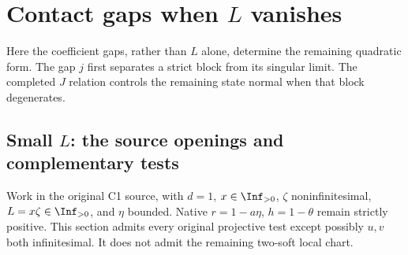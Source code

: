 \section{Contact gaps when $L$ vanishes}
Here the coefficient gaps, rather than $L$ alone, determine the remaining quadratic form. The gap $j$ first separates a strict block from its singular limit. The completed $J$ relation controls the remaining state normal when that block degenerates.

\subsection{Small $L$: the source openings and complementary tests}

\label{component:p6d2f659c0fde}

\label{p6d2f659c0fde:sec:r8-c1-small-L-bounded-eta}

Work in the original C1 source, with $d=1$, $x\in\Inf_{>0}$,
$\zeta$ noninfinitesimal, $L=x\zeta\in\Inf_{>0}$, and $\eta$
bounded. Native $r=1-a\eta$, $h=1-\theta$ remain strictly positive.
This section admits every original projective test except possibly
$u,v$ both infinitesimal. It does not admit the remaining two-soft
local chart.

